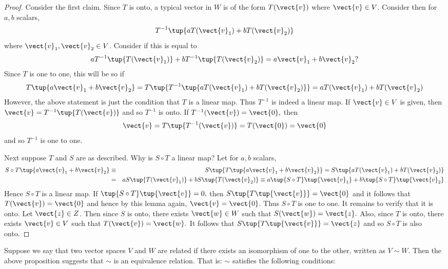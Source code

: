\begin{proof}
Consider the first claim. Since $T$ is onto, a typical
vector in $W$ is of the form $T(\vect{v})$ where $\vect{v} \in V$. Consider then for $a,b$
scalars, 
\begin{equation*}
T^{-1}\tup{aT(\vect{v}_{1})+bT(\vect{v}_{2})}
\end{equation*}
where $\vect{v}_{1}, \vect{v}_2 \in V$. Consider if this is equal to 
\begin{equation*}
aT^{-1}\tup{T(\vect{v}_{1})} +bT^{-1}\tup{T(\vect{v}_{2})} =a\vect{v}_{1}+b\vect{v}_{2}?
\end{equation*}
Since $T$ is one to one, this will be so if 
\begin{equation*}
T\tup{a\vect{v}_{1}+b\vect{v}_{2}} =T\tup{T^{-1}\tup{aT(\vect{v}_{1})+bT(\vect{v}_{2})}
} =aT(\vect{v}_{1})+bT(\vect{v}_{2})
\end{equation*}
However, the above statement is just the condition that $T$ is a linear map.
Thus $T^{-1}$ is indeed a linear map. If $\vect{v} \in V$ is given, then $
\vect{v}=T^{-1}\tup{T(\vect{v})} $ and so $T^{-1}$ is onto. If $T^{-1}(\vect{v})=\vect{0},$ then 
\begin{equation*}
\vect{v}=T\tup{T^{-1}(\vect{v})} =T(\vect{0})=\vect{0}
\end{equation*}
and so  $T^{-1}$ is one to one.

Next suppose $T$ and $S$ are as described. Why is $S\circ T$ a linear map?
Let for $a,b$ scalars,
\begin{eqnarray*}
S\circ T\tup{a\vect{v}_{1}+b\vect{v}_{2}} &\equiv &S\tup{T\tup{
a\vect{v}_{1}+b\vect{v}_{2}} } =S\tup{aT(\vect{v}_{1})+bT(\vect{v}_{2})} \\
&=&aS\tup{T(\vect{v}_{1})} +bS\tup{T(\vect{v}_{2})} \equiv a\tup{S\circ
T} \tup{\vect{v}_{1}} +b\tup{S\circ T} \tup{\vect{v}_{2}}
\end{eqnarray*}
Hence $S\circ T$ is a linear map. If $\tup{S\circ T} \tup{\vect{v}}
=0,$ then $S\tup{T\tup{\vect{v} } } =\vect{0}$ and it follows that $T(\vect{v})=\vect{0}$ and hence by this lemma again, $\vect{v}=\vect{0}$. Thus $S\circ
T $ is one to one. It remains to verify that it is onto. Let $\vect{z}\in Z$. Then
since $S$ is onto, there exists $\vect{w}\in W$ such that $S(\vect{w})=\vect{z}.$ Also, since $T$
is onto, there exists $\vect{v}\in V$ such that $T(\vect{v})=\vect{w}.$ It follows that $S\tup{
T\tup{\vect{v}} } =\vect{z}$ and so $S\circ T$ is also onto.
\end{proof}

Suppose we say that two vector spaces $V$ and $W$ are related if there exists an isomorphism of one to the other, written as $V\sim W$. 
Then the above proposition suggests that $\sim $ is an equivalence relation. That is: $\sim $
satisfies the following conditions:

